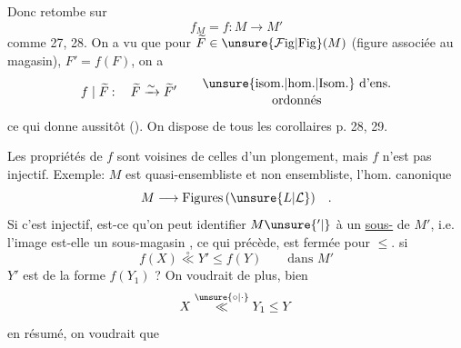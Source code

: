 
Donc   retombe sur
\[
 f_M=f\mathbin{:}M\longrightarrow M'
\]
comme  27, 28. On a vu  que pour  $\widetilde F\in\unsure{\mathcal{F}\mathrm{ig}|\mathrm{Fig}}(M)$ (figure associée au magasin),  $F'=f(F)$, on a
\[
 f\mid\widetilde F\mathbin{:}\quad \widetilde F\xrightarrow{\sim}\widetilde F'
 \qquad\begin{gathered}\text{\unsure{isom.|hom.|Isom.} d'ens.}\\[-2pt]\text{ordonnés}\end{gathered}
\]
ce qui donne aussitôt (). On dispose   de tous les corollaires  p. 28, 29.

Les propriétés de $f$ sont voisines de celles d'un plongement, mais  $f$ n'est  pas  injectif. Exemple:  $M$ est quasi-ensembliste et non ensembliste, l'hom. canonique
\[
 M\longrightarrow\mathrm{Figures}\,(\unsure{L|\mathcal L})\quad .
\]
Si c'est injectif, est-ce qu'on peut identifier $M{\unsure{{}'|\vphantom{'}}}$ à un \uline{sous-} de $M'$, i.e. l'image est-elle un sous-magasin ,   ce qui précède,   est fermée pour $\leq$.   si
\[
 f(X)\mathrel{\overset{\circ}{\ll}}Y'\leq f(Y)\qquad\text{dans }M'
\]
 $Y'$ est de la forme $f(Y_1)$ ? On voudrait de plus, bien 
\[
 X\mathrel{\overset{\unsure{\circ|\cdot}}{\ll}}Y_1\leq Y
\]
en résumé, on voudrait que
